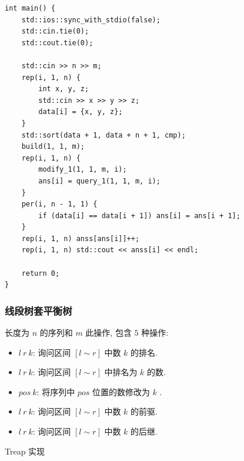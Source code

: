 \documentclass[UTF8, a4paper, titlepage, twoside]{ctexart}
\begin{document}
\begin{lstlisting}
int main() {
    std::ios::sync_with_stdio(false);
    std::cin.tie(0);
    std::cout.tie(0);

    std::cin >> n >> m;
    rep(i, 1, n) {
        int x, y, z;
        std::cin >> x >> y >> z;
        data[i] = {x, y, z};
    }
    std::sort(data + 1, data + n + 1, cmp);
    build(1, 1, m);
    rep(i, 1, n) {
        modify_1(1, 1, m, i);
        ans[i] = query_1(1, 1, m, i);
    }
    per(i, n - 1, 1) {
        if (data[i] == data[i + 1]) ans[i] = ans[i + 1];
    }
    rep(i, 1, n) anss[ans[i]]++;
    rep(i, 1, n) std::cout << anss[i] << endl;

    return 0;
}
\end{lstlisting}

\subsubsection{ 线段树套平衡树 }
长度为 $n$ 的序列和 $m$ 此操作, 包含 $5$ 种操作: 
\begin{itemize}
	\item $l \ r \ k$: 询问区间 $[l \sim r]$ 中数 $k$ 的排名. 
	\item $l \ r \ k$: 询问区间 $[l \sim r]$ 中排名为 $k$ 的数. 
	\item $pos \ k$: 将序列中 $pos$ 位置的数修改为 $k$ . 
	\item $l \ r \ k$: 询问区间 $[l \sim r]$ 中数 $k$ 的前驱. 
	\item $l \ r \ k$: 询问区间 $[l \sim r]$ 中数 $k$ 的后继. 
\end{itemize}
Treap 实现
\end{document}
